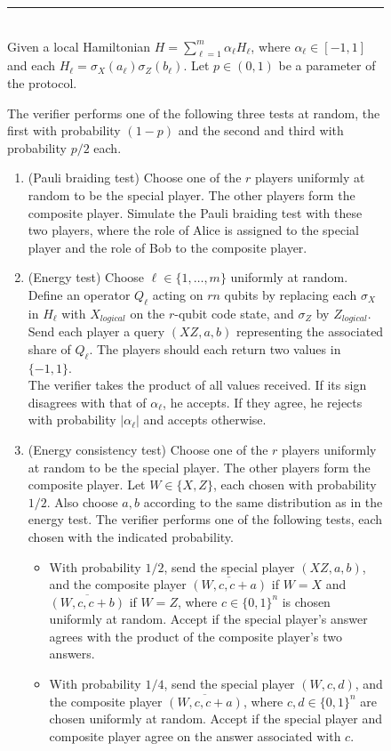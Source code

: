 \documentclass[11pt,letterpaper]{article}
\newcommand{\<}{\langle}
\renewcommand{\>}{\rangle}
\begin{document}
\begin{figure}[H]
\rule[1ex]{16.5cm}{0.5pt}\\
Given a local Hamiltonian $H = \sum_{\ell=1}^m \alpha_\ell H_\ell$, where $\alpha_\ell \in [-1,1]$ and each $H_\ell = \sigma_X(a_\ell)\sigma_{Z}(b_\ell)$. Let $p\in(0,1)$ be a parameter of the protocol.

The verifier performs one of the following three tests at random, the first with probability $(1-p)$ and the second and third with probability $p/2$ each. 
\begin{enumerate}
\item (Pauli braiding test) Choose one of the $r$ players uniformly at random to be the
  {special player}. The other players form the {composite
     player}. Simulate the Pauli braiding test with these two
   players, where the role of Alice is assigned to the special player and the role of Bob to the composite player.  
\item (Energy test) Choose $\ell\in\{1,\ldots,m\}$ uniformly at random. Define an operator $Q_\ell$ acting on $rn$ qubits by replacing each $\sigma_X$ in $H_\ell$ with $X_{logical}$ on the $r$-qubit code
  state, and $\sigma_Z$ by $Z_{logical}$. Send each player a query $(XZ,a,b)$ representing the associated share of $Q_\ell$. The players should each return two values in $\{-1,1\}$.\\
	The verifier takes the product of all values received. If its sign disagrees with that of $\alpha_\ell$, he accepts. If they agree, he rejects with probability $|\alpha_\ell|$ and accepts otherwise. 
\item (Energy consistency test) Choose one of the $r$ players uniformly at random to be the
  {special player}. The other players form the {composite
     player}. Let $W\in\{X,Z\}$, each chosen with probability
   $1/2$. Also choose $a, b$ according to the same distribution as in the
   energy test. The verifier performs one of the following tests, each
   chosen with the indicated probability.
\begin{itemize}
\item With probability $1/2$, send the special player $(XZ,a,b)$, and the composite player $\overline{(W, c, c + a)}$ if $W=X$ and $\overline{(W, c, c + b)}$ if $W=Z$, where $c \in \{0, 1\}^n$ is chosen uniformly at random. Accept if the special player's answer agrees with the product of the composite player's two answers.
\item With probability $1/4$, send the special player $(W, c, d)$, and the composite player $\overline{(W, c, c + a)}$, where $c, d \in \{0, 1\}^n$ are chosen uniformly at random. Accept if the special player and composite player agree on the answer associated with $c$.

\end{itemize}
\end{enumerate}
\end{figure}
\end{document}
